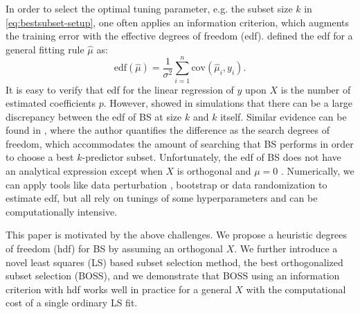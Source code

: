In order to select the optimal tuning parameter, e.g. the subset size $k$ in \eqref{eq:bestsubset-setup}, one often applies an information criterion, which augments the training error with the effective degrees of freedom (edf). \citet{Efron1986} defined the edf for a general fitting rule $\hat{\mu}$ as:
\begin{equation}
\text{edf}(\hat{\mu}) = \frac{1}{\sigma^2} \sum_{i=1}^{n} \text{cov}(\hat{\mu}_i,y_i).
\label{eq:edf}
\end{equation}
It is easy to verify that edf for the linear regression of $y$ upon $X$ is the number of estimated coefficients $p$. However, \citet{janson2015effective} showed in simulations that there can be a large discrepancy between the edf of BS at size $k$ and $k$ itself. Similar evidence can be found in \citet{Tibshirani2015}, where the author quantifies the difference as the search degrees of freedom, which accommodates the amount of searching that BS performs in order to choose a best $k$-predictor subset. Unfortunately, the edf of BS does not have an analytical expression except when $X$ is orthogonal and $\mu=0$ \citep{Ye1998}. Numerically, we can apply tools like data perturbation \citep{Ye1998}, bootstrap \citep{Efron2004} or data randomization \citep{Harris2016} to estimate edf, but all rely on tunings of some hyperparameters and can be computationally intensive. 

This paper is motivated by the above challenges. We propose a heuristic degrees of freedom (hdf) for BS by assuming an orthogonal $X$. We further introduce a novel least squares (LS) based subset selection method, the best orthogonalized subset selection (BOSS), and we demonstrate that BOSS using an information criterion with hdf works well in practice for a general $X$ with the computational cost of a single ordinary LS fit.


